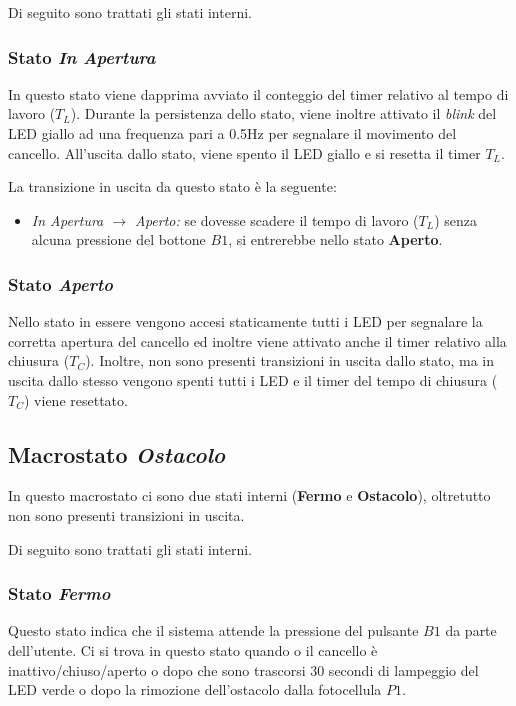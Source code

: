     \noindent Di seguito sono trattati gli stati interni.
    
    \subsubsection{Stato \textit{In Apertura}}
        In questo stato viene dapprima avviato il conteggio del timer relativo al tempo di lavoro ($T_L$).
        Durante la persistenza dello stato, viene inoltre attivato il \textit{blink} del LED giallo ad una frequenza pari a 0.5Hz per segnalare il movimento del cancello. All'uscita dallo stato, viene spento il LED giallo e si resetta il timer $T_L$.
        
        \noindent La transizione in uscita da questo stato è la seguente:
        \begin{itemize}
            \item \textit{In Apertura $\rightarrow$ Aperto:} se dovesse scadere il tempo di lavoro ($T_L$) senza alcuna pressione del bottone $B1$, si entrerebbe nello stato \textbf{Aperto}.
        \end{itemize}

    \subsubsection{Stato \textit{Aperto}}
        Nello stato in essere vengono accesi staticamente tutti i LED per segnalare la corretta apertura del cancello ed inoltre viene attivato anche il timer relativo alla chiusura ($T_C$). Inoltre, non sono presenti transizioni in uscita dallo stato, ma in uscita dallo stesso vengono spenti tutti i LED e il timer del tempo di chiusura ($T_C$) viene resettato.


\subsection{Macrostato \textit{Ostacolo}}
    In questo macrostato ci sono due stati interni (\textbf{Fermo} e \textbf{Ostacolo}), oltretutto non sono presenti transizioni in uscita.

    \noindent Di seguito sono trattati gli stati interni.
    
    \subsubsection{Stato \textit{Fermo}}
        Questo stato indica che il sistema attende la pressione del pulsante $B1$ da parte dell'utente.
        Ci si trova in questo stato quando o il cancello è inattivo/chiuso/aperto o dopo che sono trascorsi 30 secondi di lampeggio del LED verde o dopo la rimozione dell'ostacolo dalla fotocellula $P1$.
        
